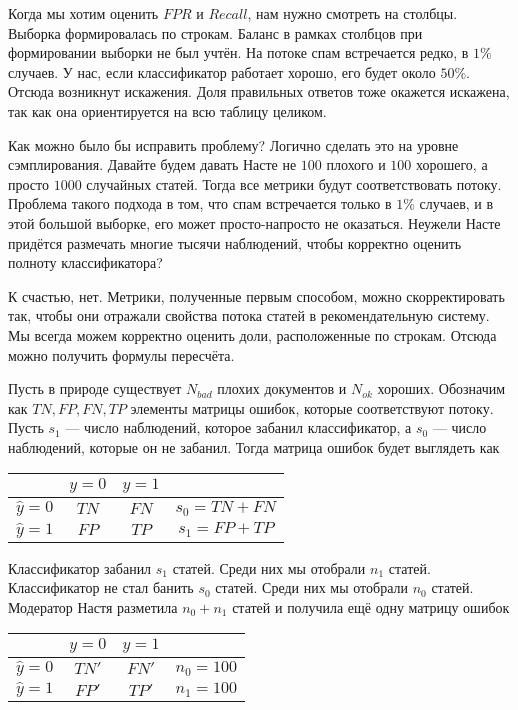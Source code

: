 \documentclass[12pt, a4paper, oneside]{article}
\begin{document}
Когда мы хотим оценить $FPR$ и $Recall$, нам нужно смотреть на столбцы. Выборка формировалась по строкам. Баланс в рамках столбцов при формировании выборки не был учтён. На потоке спам встречается редко, в $1\%$ случаев. У нас, если классификатор работает хорошо, его будет около $50\%$. Отсюда возникнут искажения. Доля правильных ответов тоже окажется искажена, так как она ориентируется на всю таблицу целиком. 

Как можно было бы исправить проблему? Логично сделать это на уровне сэмплирования. Давайте будем давать Насте не $100$ плохого и $100$ хорошего, а просто $1000$ случайных статей. Тогда все метрики будут соответствовать потоку. Проблема такого подхода в том, что спам встречается только в $1\%$ случаев, и в этой большой выборке, его может просто-напросто не оказаться. Неужели Насте придётся размечать многие тысячи наблюдений, чтобы корректно оценить полноту классификатора?  

К счастью, нет. Метрики, полученные первым способом, можно скорректировать так, чтобы они отражали свойства потока статей в рекомендательную систему. Мы всегда можем корректно оценить доли, расположенные по строкам. Отсюда можно получить формулы пересчёта. 

Пусть в природе существует $N_{bad}$ плохих документов и $N_{ok}$ хороших. Обозначим как $TN, FP, FN, TP$ элементы матрицы ошибок, которые соответствуют потоку.  Пусть $s_1$ --- число наблюдений, которое забанил классификатор, а $s_0$ --- число наблюдений, которые он не забанил. Тогда матрица ошибок будет выглядеть как 

\begin{center}
	\begin{tabular}{|c|c|c|c|}
		\hline
		& $y=0$  &  $ y = 1$ & \\  \hline 
		$\hat y = 0$ & $TN$ & $FN$ & $s_0 = TN + FN$\\ \hline 
		$\hat y = 1$ & $FP$ & $TP$ & $s_1 = FP + TP$\\ \hline
	\end{tabular} 
\end{center}

Классификатор забанил $s_1$ статей. Среди них мы отобрали $n_1$ статей. Классификатор не стал банить $s_0$ статей. Среди них мы отобрали $n_0$ статей. Модератор Настя разметила $n_0 + n_1$ статей и получила ещё одну матрицу ошибок 

\begin{center}
    \begin{tabular}{|c|c|c|c|}
		\hline
		& $y=0$  &  $ y = 1$ & \\  \hline 
		$\hat y = 0$ & $TN'$ & $FN'$ & $n_0 = 100$ \\ \hline 
		$\hat y = 1$ & $FP'$ & $TP'$ & $n_1 = 100$ \\ \hline
	\end{tabular}
\end{center}
\end{document}
